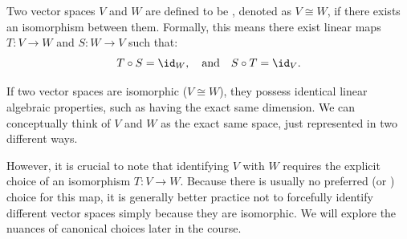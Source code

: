 \begin{definition}
\label{def:isomorphic_spaces}
Two vector spaces $V$ and $W$ are defined to be , denoted as $V \cong W$, if there exists an isomorphism between them. Formally, this means there exist linear maps $T: V \to W$ and $S: W \to V$ such that:
\[
T \circ S = \id_W, \quad \text{and} \quad S \circ T = \id_V.
\]

\begin{center}
\end{center}

\end{definition}

\begin{remark}
\label{rem:significance_of_iso}
If two vector spaces are isomorphic ($V \cong W$), they possess identical linear algebraic properties, such as having the exact same dimension. We can conceptually think of $V$ and $W$ as the exact same space, just represented in two different ways. 

However, it is crucial to note that identifying $V$ with $W$ requires the explicit choice of an isomorphism $T: V \to W$. Because there is usually no preferred (or ) choice for this map, it is generally better practice not to forcefully identify different vector spaces simply because they are isomorphic. We will explore the nuances of canonical choices later in the course.
\end{remark}